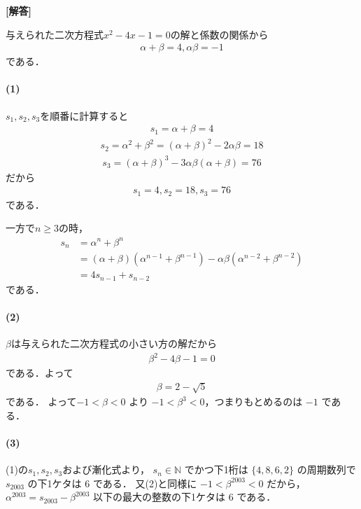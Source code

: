 \documentclass[../../main.tex]{subfiles}
\begin{document}
\begin{oframed}
  
\end{oframed}

{\bf [解答]}

与えられた二次方程式$x^2-4x-1=0$の解と係数の関係から
\begin{align}
  \alpha+\beta=4, \alpha\beta=-1 \label{eq:1}
\end{align}
である．

\paragraph{(1)}

$s_1,s_2,s_3$を順番に計算すると
\begin{align}
  s_1 = \alpha+\beta = 4
\end{align}
\begin{align}
  s_2 = \alpha^2+\beta^2 = (\alpha+\beta)^2-2\alpha\beta = 18
\end{align}
\begin{align}
  s_3 = (\alpha+\beta)^3-3\alpha\beta(\alpha+\beta) = 76
\end{align}
だから
\begin{align}
  s_1 = 4, s_2 = 18, s_3 = 76
\end{align}
である．

一方で$n \ge 3$の時，
\begin{align}
  s_n
  &= \alpha^n+\beta^n \\
  &= (\alpha+\beta)\left(\alpha^{n-1}+\beta^{n-1}\right) - \alpha\beta\left(\alpha^{n-2}+\beta^{n-2}\right) \\
  &= 4s_{n-1} + s_{n-2}
\end{align}
である．

\paragraph{(2)}

$\beta$は与えられた二次方程式の小さい方の解だから
\begin{align}
  \beta^2-4\beta-1=0
\end{align}
である．よって
\begin{align}
  \beta = 2-\sqrt{5}
\end{align}
である．
よって$-1 < \beta < 0$ より $-1 < \beta^3 < 0$，つまりもとめるのは $-1$ である．

\paragraph{(3)}

(1)の$s_1,s_2,s_3$および漸化式より，
$s_n \in \mathbb{N}$ でかつ下1桁は $\{4, 8, 6, 2\}$ の周期数列で $s_{2003}$ の下1ケタは $6$ である．
又(2)と同様に $-1 < \beta^{2003} < 0$ だから，$\alpha^{2003} = s_{2003} - \beta^{2003}$ 以下の最大の整数の下1ケタは $6$ である．
\end{document}
